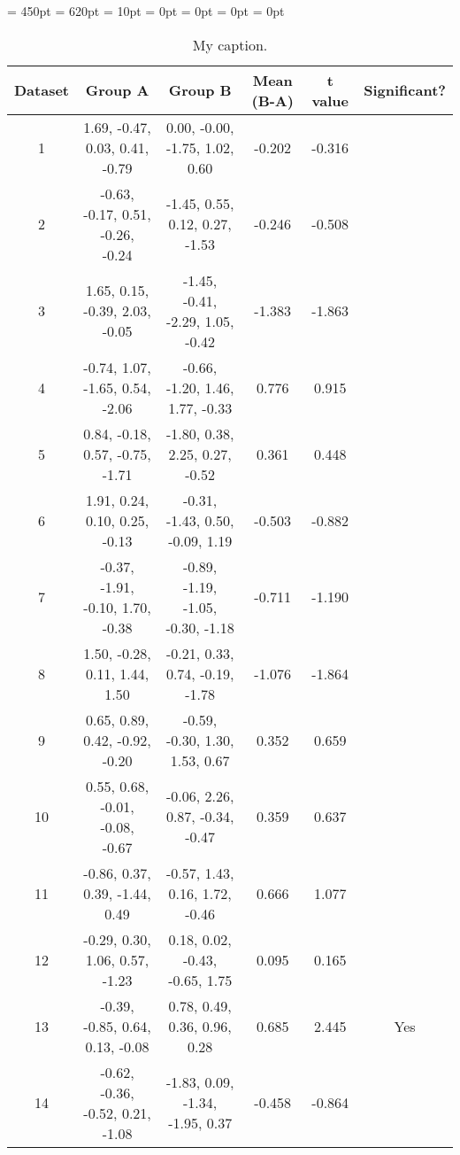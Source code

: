 \documentclass[11pt]{article}
\begin{document}
\textwidth = 450pt
\textheight = 620pt
\oddsidemargin = 10pt
\voffset = 0pt
\topmargin = 0pt
\headheight = 0pt
\footskip = 0pt



\begin{table}[ht]
\caption{My caption.}
\begin{tabular}{ | c | c | c | c | c | c |}
\hline
Dataset & Group A & Group B & Mean (B-A) & t value & Significant?\\
\hline
1 & \tiny 1.69, -0.47, 0.03, 0.41, -0.79 & \tiny 0.00, -0.00, -1.75, 1.02, 0.60 & \tiny -0.202 & \tiny -0.316 & \\
2 & \tiny -0.63, -0.17, 0.51, -0.26, -0.24 & \tiny -1.45, 0.55, 0.12, 0.27, -1.53 & \tiny -0.246 & \tiny -0.508 & \\
3 & \tiny 1.65, 0.15, -0.39, 2.03, -0.05 & \tiny -1.45, -0.41, -2.29, 1.05, -0.42 & \tiny -1.383 & \tiny -1.863 & \\
4 & \tiny -0.74, 1.07, -1.65, 0.54, -2.06 & \tiny -0.66, -1.20, 1.46, 1.77, -0.33 & \tiny 0.776 & \tiny 0.915 & \\
5 & \tiny 0.84, -0.18, 0.57, -0.75, -1.71 & \tiny -1.80, 0.38, 2.25, 0.27, -0.52 & \tiny 0.361 & \tiny 0.448 & \\
6 & \tiny 1.91, 0.24, 0.10, 0.25, -0.13 & \tiny -0.31, -1.43, 0.50, -0.09, 1.19 & \tiny -0.503 & \tiny -0.882 & \\
7 & \tiny -0.37, -1.91, -0.10, 1.70, -0.38 & \tiny -0.89, -1.19, -1.05, -0.30, -1.18 & \tiny -0.711 & \tiny -1.190 & \\
8 & \tiny 1.50, -0.28, 0.11, 1.44, 1.50 & \tiny -0.21, 0.33, 0.74, -0.19, -1.78 & \tiny -1.076 & \tiny -1.864 & \\
9 & \tiny 0.65, 0.89, 0.42, -0.92, -0.20 & \tiny -0.59, -0.30, 1.30, 1.53, 0.67 & \tiny 0.352 & \tiny 0.659 & \\
10 & \tiny 0.55, 0.68, -0.01, -0.08, -0.67 & \tiny -0.06, 2.26, 0.87, -0.34, -0.47 & \tiny 0.359 & \tiny 0.637 & \\
11 & \tiny -0.86, 0.37, 0.39, -1.44, 0.49 & \tiny -0.57, 1.43, 0.16, 1.72, -0.46 & \tiny 0.666 & \tiny 1.077 & \\
12 & \tiny -0.29, 0.30, 1.06, 0.57, -1.23 & \tiny 0.18, 0.02, -0.43, -0.65, 1.75 & \tiny 0.095 & \tiny 0.165 & \\
13 & \tiny -0.39, -0.85, 0.64, 0.13, -0.08 & \tiny 0.78, 0.49, 0.36, 0.96, 0.28 & \tiny 0.685 & \tiny 2.445 & Yes\\
14 & \tiny -0.62, -0.36, -0.52, 0.21, -1.08 & \tiny -1.83, 0.09, -1.34, -1.95, 0.37 & \tiny -0.458 & \tiny -0.864 & \\

\end{tabular}
\end{table}
\end{document}
